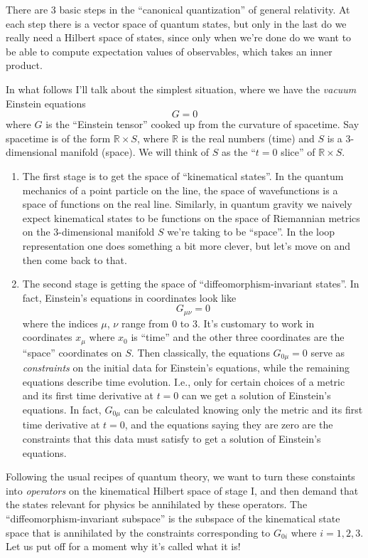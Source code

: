 \documentclass{article}
\begin{document}
There are 3 basic steps in the ``canonical quantization'' of general
relativity. At each step there is a vector space of quantum states, but
only in the last do we really need a Hilbert space of states, since only
when we're done do we want to be able to compute expectation values of
observables, which takes an inner product.

In what follows I'll talk about the simplest situation, where we have
the \emph{vacuum} Einstein equations \[G = 0\] where \(G\) is the
``Einstein tensor'' cooked up from the curvature of spacetime. Say
spacetime is of the form \(\mathbb{R} \times S\), where \(\mathbb{R}\)
is the real numbers (time) and \(S\) is a \(3\)-dimensional manifold
(space). We will think of \(S\) as the ``\(t = 0\) slice'' of
\(\mathbb{R} \times S\).

\begin{enumerate}
\def\labelenumi{\Roman{enumi})}
\item
  The first stage is to get the space of ``kinematical states''. In the
  quantum mechanics of a point particle on the line, the space of
  wavefunctions is a space of functions on the real line. Similarly, in
  quantum gravity we naively expect kinematical states to be functions
  on the space of Riemannian metrics on the \(3\)-dimensional manifold
  \(S\) we're taking to be ``space''. In the loop representation one
  does something a bit more clever, but let's move on and then come back
  to that.
\item
  The second stage is getting the space of ``diffeomorphism-invariant
  states''. In fact, Einstein's equations in coordinates look like
  \[G_{\mu \nu} = 0\] where the indices \(\mu\), \(\nu\) range from 0 to
  3. It's customary to work in coordinates \(x_{\mu}\) where \(x_0\) is
  ``time'' and the other three coordinates are the ``space'' coordinates
  on \(S\). Then classically, the equations \(G_{0 \mu} = 0\) serve as
  \emph{constraints} on the initial data for Einstein's equations, while
  the remaining equations describe time evolution. I.e., only for
  certain choices of a metric and its first time derivative at \(t = 0\)
  can we get a solution of Einstein's equations. In fact, \(G_{0 \mu}\)
  can be calculated knowing only the metric and its first time
  derivative at \(t = 0\), and the equations saying they are zero are
  the constraints that this data must satisfy to get a solution of
  Einstein's equations.
\end{enumerate}

Following the usual recipes of quantum theory, we want to turn these
constaints into \emph{operators} on the kinematical Hilbert space of
stage I, and then demand that the states relevant for physics be
annihilated by these operators. The ``diffeomorphism-invariant
subspace'' is the subspace of the kinematical state space that is
annihilated by the constraints corresponding to \(G_{0i}\) where
\(i = 1, 2, 3\). Let us put off for a moment why it's called what it is!
\end{document}
